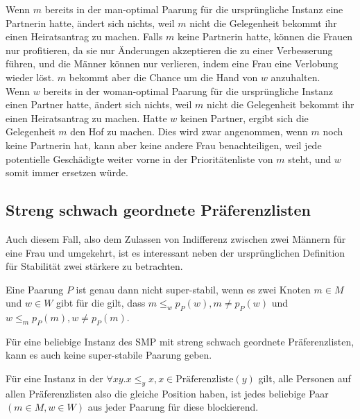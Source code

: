 \begin{Beweis}
\label{element_enfuegen_bew}
  Wenn $m$ bereits in der man-optimal Paarung für die ursprüngliche Instanz eine Partnerin hatte, ändert sich nichts, weil $m$ nicht die Gelegenheit bekommt ihr einen Heiratsantrag zu machen. Falls $m$ keine Partnerin hatte, können die Frauen nur profitieren, da sie nur Änderungen akzeptieren die zu einer Verbesserung führen, und die Männer können nur verlieren, indem eine Frau eine Verlobung wieder löst. $m$ bekommt aber die Chance um die Hand von $w$ anzuhalten.\\
  Wenn $w$ bereits in der woman-optimal Paarung für die ursprüngliche Instanz einen Partner hatte, ändert sich nichts, weil $m$ nicht die Gelegenheit bekommt ihr einen Heiratsantrag zu machen. Hatte $w$ keinen Partner, ergibt sich die Gelegenheit $m$ den Hof zu machen. Dies wird zwar angenommen, wenn $m$ noch keine Partnerin hat, kann aber keine andere Frau benachteiligen, weil jede potentielle Geschädigte weiter vorne in der Prioritätenliste von $m$ steht, und $w$ somit immer ersetzen würde.
\end{Beweis}

\subsection{Streng schwach geordnete Präferenzlisten}

Auch diesem Fall, also dem Zulassen von Indifferenz zwischen zwei Männern für eine Frau und umgekehrt, ist es interessant neben der ursprünglichen Definition für Stabilität zwei stärkere zu betrachten.

\begin{Definition}
\label{super-stabil}
  Eine Paarung $P$ ist genau dann nicht super-stabil, wenn es zwei Knoten $m \in M$ und $w \in W$ gibt für die gilt, dass $m \leq_{w} p_{P}(w), m \neq p_{P}(w)$ und $w \leq_{m} p_{P}(m), w \neq p_{P}(m)$.
\end{Definition}

\begin{Proposition}
\label{keine_super-stabil}
  Für eine beliebige Instanz des SMP mit streng schwach geordnete Präferenzlisten, kann es auch keine super-stabile Paarung geben.
\end{Proposition}

\begin{Beweis}
\label{keine_super-stabil_bew}
  Für eine Instanz in der $\forall x y. x \leq_{y} x, x \in \textrm{Pr\"aferenzliste}(y)$ gilt, alle Personen auf allen Präferenzlisten also die gleiche Position haben, ist jedes beliebige Paar $(m \in M,w \in W)$ aus jeder Paarung für diese blockierend.
\end{Beweis}

